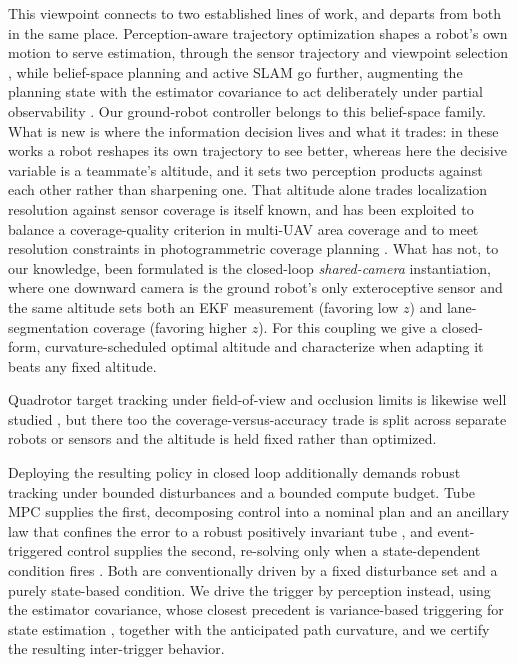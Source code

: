 \documentclass{ifacconf}
\begin{document}
This viewpoint connects to two established lines of work, and departs from both in the same place.
Perception-aware trajectory optimization shapes a robot's own motion to serve estimation, through the
sensor trajectory \citep{falanga2018pampc,spasojevic2020perception} and viewpoint selection
\citep{zhang2019fisher}, while belief-space planning and active SLAM go further, augmenting the planning
state with the estimator covariance to act deliberately under partial observability
\citep{platt2010belief,vandenberg2012motion,placed2023survey}.
Our ground-robot controller belongs to this belief-space family. What is new is where the information
decision lives and what it trades: in these works a robot reshapes its own trajectory to see better, whereas
here the decisive variable is a teammate's altitude, and it sets two perception products against each other
rather than sharpening one. That altitude alone trades localization resolution against sensor coverage is
itself known, and has been exploited to balance a coverage-quality criterion in multi-UAV area coverage
\citep{papatheodorou2017coverage} and to meet resolution constraints in photogrammetric coverage planning
\citep{difranco2016coverage}. What has not, to our knowledge, been formulated is the closed-loop
\emph{shared-camera} instantiation, where one downward camera is the ground robot's only exteroceptive
sensor and the same altitude sets both an EKF measurement (favoring low $z$) and lane-segmentation coverage
(favoring higher $z$). For this coupling we give a closed-form, curvature-scheduled optimal altitude and
characterize when adapting it beats any fixed altitude.

Quadrotor target tracking under field-of-view and occlusion limits is likewise well studied
\citep{thomas2017autonomous,penin2018vision}, but there too the coverage-versus-accuracy trade is split
across separate robots or sensors and the altitude is held fixed rather than optimized.

Deploying the resulting policy in closed loop additionally demands robust tracking
under bounded disturbances and a bounded compute budget. Tube MPC supplies the first, decomposing control
into a nominal plan and an ancillary law that confines the error to a robust positively invariant tube
\citep{mayne2005robust,mRPI}, and event-triggered
control supplies the second, re-solving only when a state-dependent condition fires
\citep{tabuada2007event,li2014event}. Both are conventionally driven
by a fixed disturbance set and a purely state-based condition. We drive the trigger by perception instead,
using the estimator covariance, whose closest precedent is variance-based triggering for state estimation
\citep{trimpe2014event}, together with the anticipated path curvature, and we certify the resulting
inter-trigger behavior.
\end{document}
